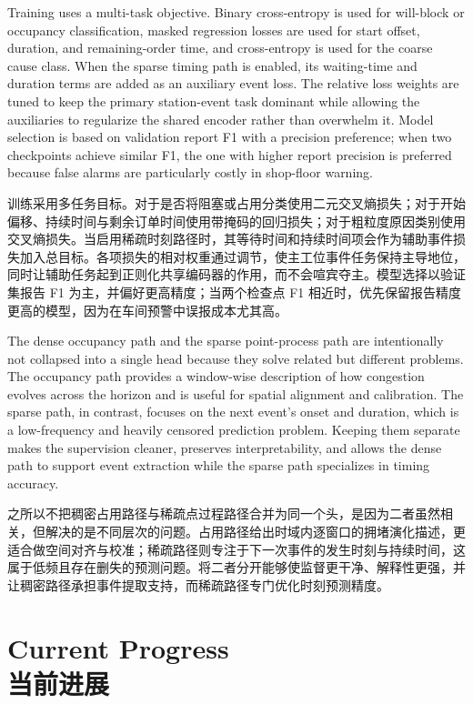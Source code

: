 \documentclass[12pt,a4paper,oneside,scheme=plain]{ctexrep}
\newcommand{\bip}[2]{%
  \par #1\par
  \nobreak\vspace{0.12em}%
  {\small\color{black!62}#2}\par
  \vspace{0.62em}%
}
\begin{document}
\bip
{Training uses a multi-task objective. Binary cross-entropy is used for will-block or occupancy classification, masked regression losses are used for start offset, duration, and remaining-order time, and cross-entropy is used for the coarse cause class. When the sparse timing path is enabled, its waiting-time and duration terms are added as an auxiliary event loss. The relative loss weights are tuned to keep the primary station-event task dominant while allowing the auxiliaries to regularize the shared encoder rather than overwhelm it. Model selection is based on validation report F1 with a precision preference; when two checkpoints achieve similar F1, the one with higher report precision is preferred because false alarms are particularly costly in shop-floor warning.}
{训练采用多任务目标。对于是否将阻塞或占用分类使用二元交叉熵损失；对于开始偏移、持续时间与剩余订单时间使用带掩码的回归损失；对于粗粒度原因类别使用交叉熵损失。当启用稀疏时刻路径时，其等待时间和持续时间项会作为辅助事件损失加入总目标。各项损失的相对权重通过调节，使主工位事件任务保持主导地位，同时让辅助任务起到正则化共享编码器的作用，而不会喧宾夺主。模型选择以验证集报告 F1 为主，并偏好更高精度；当两个检查点 F1 相近时，优先保留报告精度更高的模型，因为在车间预警中误报成本尤其高。}

\bip
{The dense occupancy path and the sparse point-process path are intentionally not collapsed into a single head because they solve related but different problems. The occupancy path provides a window-wise description of how congestion evolves across the horizon and is useful for spatial alignment and calibration. The sparse path, in contrast, focuses on the next event's onset and duration, which is a low-frequency and heavily censored prediction problem. Keeping them separate makes the supervision cleaner, preserves interpretability, and allows the dense path to support event extraction while the sparse path specializes in timing accuracy.}
{之所以不把稠密占用路径与稀疏点过程路径合并为同一个头，是因为二者虽然相关，但解决的是不同层次的问题。占用路径给出时域内逐窗口的拥堵演化描述，更适合做空间对齐与校准；稀疏路径则专注于下一次事件的发生时刻与持续时间，这属于低频且存在删失的预测问题。将二者分开能够使监督更干净、解释性更强，并让稠密路径承担事件提取支持，而稀疏路径专门优化时刻预测精度。}

\chapter[Current Progress / 当前进展]{Current Progress\\[0.3em]{\large 当前进展}}
\label{ch:progress}
\end{document}
